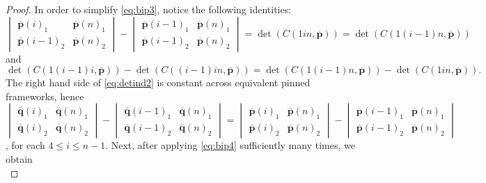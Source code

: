 \documentclass[10pt,a4paper]{amsart}
\begin{document}
\begin{proof}
    In order to simplify \cref{eq:bip3}, notice the following identities:
    \begin{equation}\label{eq:detind1}
        \begin{vmatrix} \overline{\mathbf{p}}(i)_1 & \overline{\mathbf{p}}(n)_1 \\ \overline{\mathbf{p}}(i-1)_2 & \overline{\mathbf{p}}(n)_2 \end{vmatrix} - \begin{vmatrix} \overline{\mathbf{p}}(i-1)_1 & \overline{\mathbf{p}}(n)_1 \\ \overline{\mathbf{p}}(i-1)_2 & \overline{\mathbf{p}}(n)_2 \end{vmatrix} = \det(C(1in,\overline{\mathbf{p}})) = \det(C(1(i-1)n,\overline{\mathbf{p}}))
    \end{equation}
    and
    \begin{equation}\label{eq:detind2}
        \det(C(1(i-1)i,\overline{\mathbf{p}})) - \det(C((i-1)in,\overline{\mathbf{p}})) = \det(C(1(i-1)n,\overline{\mathbf{p}})) - \det(C(1in,\overline{\mathbf{p}})).
    \end{equation}
    The right hand side of \cref{eq:detind2} is constant across equivalent pinned frameworks, hence
    \begin{equation}\label{eq:bip4}
        \begin{vmatrix} \overline{\mathbf{q}}(i)_1 & \overline{\mathbf{q}}(n)_1 \\ \overline{\mathbf{q}}(i)_2 & \overline{\mathbf{q}}(n)_2 \end{vmatrix} - \begin{vmatrix} \overline{\mathbf{q}}(i-1)_1 & \overline{\mathbf{q}}(n)_1 \\ \overline{\mathbf{q}}(i-1)_2 & \overline{\mathbf{q}}(n)_2 \end{vmatrix} = \begin{vmatrix} \overline{\mathbf{p}}(i)_1 & \overline{\mathbf{p}}(n)_1 \\ \overline{\mathbf{p}}(i)_2 & \overline{\mathbf{p}}(n)_2 \end{vmatrix} - \begin{vmatrix} \overline{\mathbf{p}}(i-1)_1 & \overline{\mathbf{p}}(n)_1 \\ \overline{\mathbf{p}}(i-1)_2 & \overline{\mathbf{p}}(n)_2 \end{vmatrix}
    \end{equation},
    for each $4\leq i\leq n-1$.
    Next, after applying \cref{eq:bip4} sufficiently many times, we obtain
    \begin{equation}

\end{equation}
\end{proof}
\end{document}
